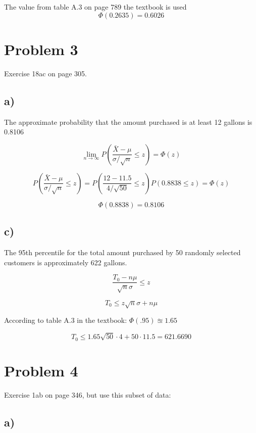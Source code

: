 \documentclass[a4paper,11pt]{article}
\begin{document}
\vspace{1cm}
The value from table A.3  on page 789 the textbook is used
\[ \Phi(0.2635) = 0.6026\]

\clearpage

\section*{Problem 3}

Exercise 18ac on page 305.

\subsection*{a)}

The approximate probability that the amount purchased is at least 12 gallons is 0.8106

\[ \lim_{n \rightarrow \infty} P\left(\frac{\bar{X} - \mu}{\sigma / \sqrt{n}} \le z \right) = \Phi(z)\]

\[ P\left(\frac{\bar{X} - \mu}{\sigma / \sqrt{n}} \le z \right) = P\left(\frac{12 - 11.5}{4 / \sqrt{50}} \le z \right) P(0.8838 \le z) =  \Phi(z)\]

\[\Phi(0.8838) = 0.8106 \]

\subsection*{c)}

The 95th percentile for the total amount purchased by 50 randomly selected customers is approximately 622 gallons.

\[ \frac{T_0 - n \mu}{\sqrt{n} \sigma} \le z\]

\[ T_0 \le z \sqrt{n} \sigma +  n \mu \]

\vspace{5mm}
According to table A.3 in the textbook: $ \Phi(.95) \approxeq 1.65 $

\[ T_0 \le 1.65 \sqrt{50} \cdot 4 +  50 \cdot 11.5 = 621.6690 \]

\clearpage

\section*{Problem 4}

Exercise 1ab on page 346, but use this subset of data:

\subsection*{a)}
\end{document}

